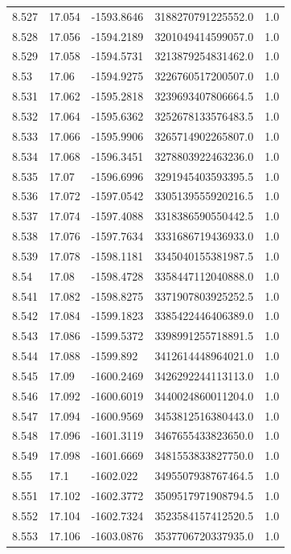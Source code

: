 \begin{tabular}{lllll}
8.527 & 17.054 & -1593.8646 & 3188270791225552.0 & 1.0 \\
8.528 & 17.056 & -1594.2189 & 3201049414599057.0 & 1.0 \\
8.529 & 17.058 & -1594.5731 & 3213879254831462.0 & 1.0 \\
8.53 & 17.06 & -1594.9275 & 3226760517200507.0 & 1.0 \\
8.531 & 17.062 & -1595.2818 & 3239693407806664.5 & 1.0 \\
8.532 & 17.064 & -1595.6362 & 3252678133576483.5 & 1.0 \\
8.533 & 17.066 & -1595.9906 & 3265714902265807.0 & 1.0 \\
8.534 & 17.068 & -1596.3451 & 3278803922463236.0 & 1.0 \\
8.535 & 17.07 & -1596.6996 & 3291945403593395.5 & 1.0 \\
8.536 & 17.072 & -1597.0542 & 3305139555920216.5 & 1.0 \\
8.537 & 17.074 & -1597.4088 & 3318386590550442.5 & 1.0 \\
8.538 & 17.076 & -1597.7634 & 3331686719436933.0 & 1.0 \\
8.539 & 17.078 & -1598.1181 & 3345040155381987.5 & 1.0 \\
8.54 & 17.08 & -1598.4728 & 3358447112040888.0 & 1.0 \\
8.541 & 17.082 & -1598.8275 & 3371907803925252.5 & 1.0 \\
8.542 & 17.084 & -1599.1823 & 3385422446406389.0 & 1.0 \\
8.543 & 17.086 & -1599.5372 & 3398991255718891.5 & 1.0 \\
8.544 & 17.088 & -1599.892 & 3412614448964021.0 & 1.0 \\
8.545 & 17.09 & -1600.2469 & 3426292244113113.0 & 1.0 \\
8.546 & 17.092 & -1600.6019 & 3440024860011204.0 & 1.0 \\
8.547 & 17.094 & -1600.9569 & 3453812516380443.0 & 1.0 \\
8.548 & 17.096 & -1601.3119 & 3467655433823650.0 & 1.0 \\
8.549 & 17.098 & -1601.6669 & 3481553833827750.0 & 1.0 \\
8.55 & 17.1 & -1602.022 & 3495507938767464.5 & 1.0 \\
8.551 & 17.102 & -1602.3772 & 3509517971908794.5 & 1.0 \\
8.552 & 17.104 & -1602.7324 & 3523584157412520.5 & 1.0 \\
8.553 & 17.106 & -1603.0876 & 3537706720337935.0 & 1.0 \\

\end{tabular}
